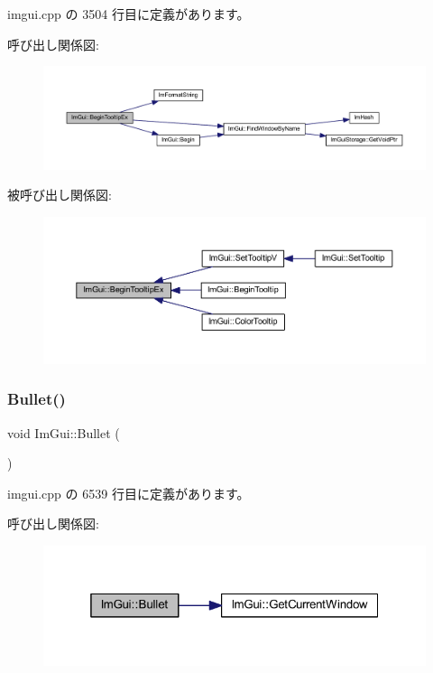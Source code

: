  imgui.\+cpp の 3504 行目に定義があります。

呼び出し関係図\+:\nopagebreak
\begin{figure}[H]
\begin{center}
\leavevmode
\includegraphics[width=350pt]{namespace_im_gui_a3189530b7795a9b99169eb95f36c516d_cgraph}
\end{center}
\end{figure}
被呼び出し関係図\+:\nopagebreak
\begin{figure}[H]
\begin{center}
\leavevmode
\includegraphics[width=350pt]{namespace_im_gui_a3189530b7795a9b99169eb95f36c516d_icgraph}
\end{center}
\end{figure}
\mbox{\label{namespace_im_gui_ae2d22212681556d2c2398dfd152f3121}} 
\subsubsection{\texorpdfstring{Bullet()}{Bullet()}}
{\footnotesize\ttfamily void Im\+Gui\+::\+Bullet (\begin{DoxyParamCaption}{ }\end{DoxyParamCaption})}



 imgui.\+cpp の 6539 行目に定義があります。

呼び出し関係図\+:\nopagebreak
\begin{figure}[H]
\begin{center}
\leavevmode
\includegraphics[width=319pt]{namespace_im_gui_ae2d22212681556d2c2398dfd152f3121_cgraph}
\end{center}
\end{figure}
\mbox{\label{namespace_im_gui_af8d34d563b17c683943a0fa7bf5807bc}} 
